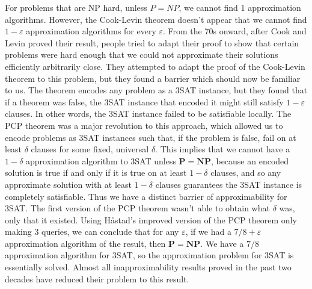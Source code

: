 \documentclass{article}
\theoremstyle{plain}
\theoremstyle{definition}
\begin{document}
For problems that are NP hard, unless $P = NP$, we cannot find 1 approximation algorithms. However, the Cook-Levin theorem doesn't appear that we cannot find $1 - \varepsilon$ approximation algorithms for every $\varepsilon$. From the 70s onward, after Cook and Levin proved their result, people tried to adapt their proof to show that certain problems were hard enough that we could not approximate their solutions efficiently arbitrarily close. They attempted to adapt the proof of the Cook-Levin theorem to this problem, but they found a barrier which should now be familiar to us. The theorem encodes any problem as a 3SAT instance, but they found that if a theorem was false, the 3SAT instance that encoded it might still satisfy $1 - \varepsilon$ clauses. In other words, the 3SAT instance failed to be satisfiable locally. The PCP theorem was a major revolution to this approach, which allowed us to encode problems as 3SAT instances such that, if the problem is false, fail on at least $\delta$ clauses for some fixed, universal $\delta$. This implies that we cannot have a $1 - \delta$ approximation algorithm to 3SAT unless $\mathbf{P} = \mathbf{NP}$, because an encoded solution is true if and only if it is true on at least $1 - \delta$ clauses, and so any approximate solution with at least $1 - \delta$ clauses guarantees the 3SAT instance is completely satisfiable. Thus we have a distinct barrier of approximability for 3SAT. The first version of the PCP theorem wasn't able to obtain what $\delta$ was, only that it existed. Using H\r{a}stad's improved version of the PCP theorem only making 3 queries, we can conclude that for any $\varepsilon$, if we had a $7/8 + \varepsilon$ approximation algorithm of the result, then $\mathbf{P} = \mathbf{NP}$. We have a $7/8$ approximation algorithm for 3SAT, so the approximation problem for 3SAT is essentially solved. Almost all inapproximability results proved in the past two decades have reduced their problem to this result.
\end{document}
